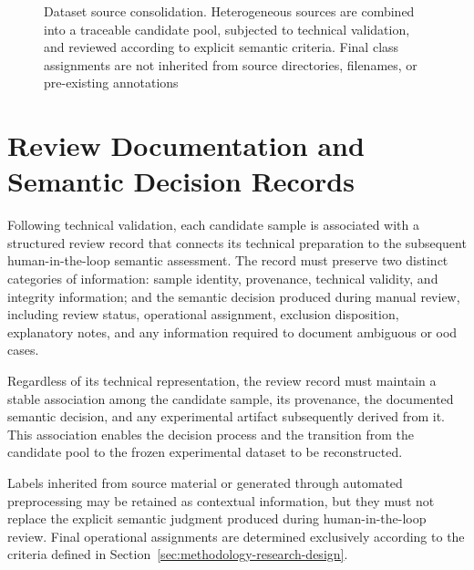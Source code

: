 \begin{figure}[H]
{%
}
\caption[Dataset source consolidation]{Dataset source consolidation.
Heterogeneous sources are combined into a traceable candidate pool, subjected
to technical validation, and reviewed according to explicit semantic criteria.
Final class assignments are not inherited from source directories, filenames,
or pre-existing annotations}
\label{fig:methodology-dataset-source-consolidation}
\end{figure}

\section{Review Documentation and Semantic Decision Records}
\label{sec:methodology-review-manifest}

Following technical validation, each candidate sample is associated with a
structured review record that connects its technical preparation to the
subsequent human-in-the-loop semantic assessment. The record must preserve two
distinct categories of information: sample identity, provenance, technical
validity, and integrity information; and the semantic decision produced during
manual review, including review status, operational assignment, exclusion
disposition, explanatory notes, and any information required to document
ambiguous or \gls{ood} cases.

Regardless of its technical representation, the review record must maintain a
stable association among the candidate sample, its provenance, the documented
semantic decision, and any experimental artifact subsequently derived from it.
This association enables the decision process and the transition from the
candidate pool to the frozen experimental dataset to be reconstructed.

Labels inherited from source material or generated through automated
preprocessing may be retained as contextual information, but they must not
replace the explicit semantic judgment produced during human-in-the-loop
review. Final operational assignments are determined exclusively according to
the criteria defined in
Section~\ref{sec:methodology-research-design}.

